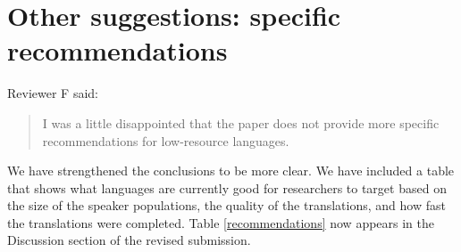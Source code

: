 \documentclass[11pt]{article}
\begin{document}
\section{Other suggestions: specific recommendations}

Reviewer F said:
\begin{quote}
I was a little disappointed that the paper does not provide more specific
recommendations for low-resource languages.
\end{quote}

We have strengthened the conclusions to be more clear.  We have included a table that shows what languages are currently good for researchers to target based on the size of the speaker populations, the quality of the translations, and how fast the translations were completed.  Table \ref{recommendations} now appears in the Discussion section of the revised submission. 
\end{document}
